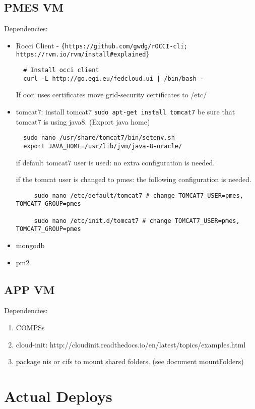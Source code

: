 \documentclass[a4paper,10pt]{article}
\begin{document}
\subsection{PMES VM}
Dependencies:
\begin{itemize}

 \item Rocci Client - \verb|{https://github.com/gwdg/rOCCI-cli; https://rvm.io/rvm/install#explained}|
 \begin{verbatim}
  # Install occi client
  curl -L http://go.egi.eu/fedcloud.ui | /bin/bash -
 \end{verbatim}
 
 \subitem If occi uses certificates move grid-security certificates to /etc/
 \item tomcat7: install tomcat7 \texttt{sudo apt-get install tomcat7}
 \subitem be sure that tomcat7 is using java8. (Export java home)
  \begin{verbatim}
  sudo nano /usr/share/tomcat7/bin/setenv.sh
  export JAVA_HOME=/usr/lib/jvm/java-8-oracle/
 \end{verbatim}
 \subitem if default tomcat7 user is used: no extra configuration is needed.
 
 \subitem if the tomcat user is changed to pmes: the following configuration is needed.
 \begin{verbatim}
     sudo nano /etc/default/tomcat7 # change TOMCAT7_USER=pmes, TOMCAT7_GROUP=pmes
     
     sudo nano /etc/init.d/tomcat7 # change TOMCAT7_USER=pmes, TOMCAT7_GROUP=pmes
 \end{verbatim}
 \item mongodb
 \item pm2
 
 \end{itemize}

 \subsection{APP VM}
 Dependencies:
 \begin{enumerate}
  \item COMPSs
  \item cloud-init: http://cloudinit.readthedocs.io/en/latest/topics/examples.html
  \item package nis or cifs to mount shared folders. (see document mountFolders)
 \end{enumerate}

\section{Actual Deploys}
\end{document}
